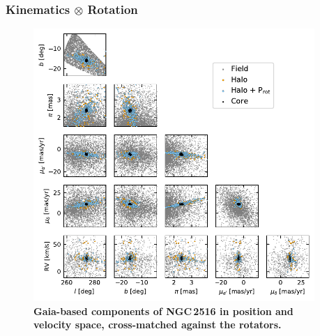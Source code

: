 \documentclass[12pt,twocolumn,tighten]{aastex63}
\begin{document}
\subsubsection{Kinematics $\otimes$ Rotation}

\begin{figure}[t]
	\begin{center}
		\leavevmode
		\includegraphics[width=0.95\textwidth]{f4.pdf}
	\end{center}
	\vspace{-0.7cm}
	\caption{ {\bf Gaia-based components of NGC\,2516 in position and
    velocity space, cross-matched against the rotators.}
		\label{fig:gaia6d_x_rotn}
	}
\end{figure}
\end{document}
